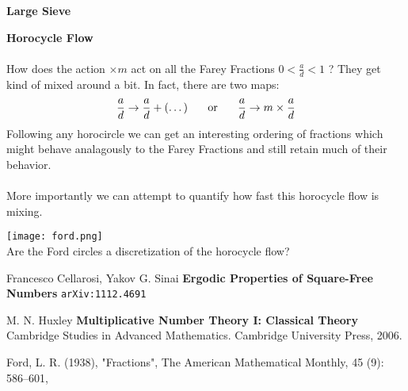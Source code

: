 \documentclass[12pt]{article}
\begin{document}
\newpage

\noindent \textbf{Large Sieve}

\newpage

\noindent \textbf{Horocycle Flow} \\ \\
How does the action $\times m $ act on all the Farey Fractions $0 < \frac{a}{d} < 1$ ? They get kind of mixed around a bit.   In fact, there are two maps:
$$ \frac{a}{d} \to \frac{a}{d} + (\dots) \hspace{0.25in}\text{or}\hspace{0.25in} \frac{a}{d} \to m \times \frac{a}{d} $$
Following any horocircle we can get an interesting ordering of fractions which might behave analagously to the Farey Fractions and still retain much of their behavior.  \\ \\
More importantly we can attempt to quantify how fast this horocycle flow is mixing.

\texttt{[image: ford.png]} \\
Are the Ford circles a discretization of the horocycle flow?

\newpage

\selectfont \fontsize{12}{10}\selectfont

\begin{thebibliography}{}

\item Francesco Cellarosi, Yakov G. Sinai \textbf{Ergodic Properties of Square-Free Numbers} \texttt{arXiv:1112.4691}

\item M. N. Huxley \textbf{Multiplicative Number Theory I: Classical Theory} Cambridge Studies in Advanced Mathematics.  Cambridge University Press, 2006.

\item  Ford, L. R. (1938), "Fractions", The American Mathematical Monthly, 45 (9): 586–601,

\end{thebibliography}
\end{document}
